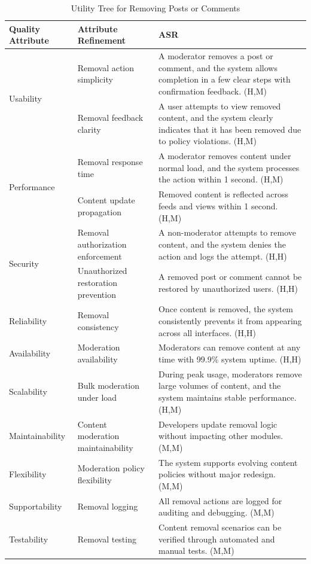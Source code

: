 \documentclass{article}
\begin{document}
\begin{table}[H]
\centering
\caption{Utility Tree for Removing Posts or Comments}
\begin{tabular}{|p{3cm}|p{4cm}|p{7cm}|}
\hline
\textbf{Quality Attribute} & \textbf{Attribute Refinement} & \textbf{ASR} \\
\hline

\multirow{2}{*}{Usability}
& Removal action simplicity
& A moderator removes a post or comment, and the system allows completion in a few clear steps with confirmation feedback. (H,M) \\
\cline{2-3}
& Removal feedback clarity
& A user attempts to view removed content, and the system clearly indicates that it has been removed due to policy violations. (H,M) \\
\hline

\multirow{2}{*}{Performance}
& Removal response time
& A moderator removes content under normal load, and the system processes the action within 1 second. (H,M) \\
\cline{2-3}
& Content update propagation
& Removed content is reflected across feeds and views within 1 second. (H,M) \\
\hline

\multirow{2}{*}{Security}
& Removal authorization enforcement
& A non-moderator attempts to remove content, and the system denies the action and logs the attempt. (H,H) \\
\cline{2-3}
& Unauthorized restoration prevention
& A removed post or comment cannot be restored by unauthorized users. (H,H) \\
\hline

Reliability
& Removal consistency
& Once content is removed, the system consistently prevents it from appearing across all interfaces. (H,H) \\
\hline

Availability
& Moderation availability
& Moderators can remove content at any time with 99.9\% system uptime. (H,H) \\
\hline

Scalability
& Bulk moderation under load
& During peak usage, moderators remove large volumes of content, and the system maintains stable performance. (H,M) \\
\hline

Maintainability
& Content moderation maintainability
& Developers update removal logic without impacting other modules. (M,M) \\
\hline

Flexibility
& Moderation policy flexibility
& The system supports evolving content policies without major redesign. (M,M) \\
\hline

Supportability
& Removal logging
& All removal actions are logged for auditing and debugging. (M,M) \\
\hline

Testability
& Removal testing
& Content removal scenarios can be verified through automated and manual tests. (M,M) \\
\hline

\end{tabular}
\end{table}
\end{document}
